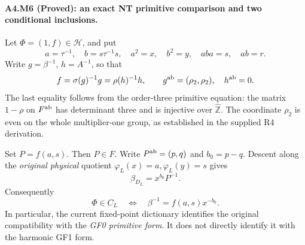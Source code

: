 \paragraph{A4.M6 (Proved): an exact NT primitive comparison and two conditional inclusions.}
Let $\Phi=(1,f)\in\mathcal H$, and put
\[
 a=\tau^{-1},\quad b=s\tau^{-1}s,\quad a^2=x,\quad b^2=y,
 \quad aba=s,\quad ab=r.
\]
Write $g=\beta^{-1}$, $h=A^{-1}$, so that
\[
 f=\sigma(g)^{-1}g=\rho(h)^{-1}h,
 \qquad g^{\rm ab}=(\rho_2,\rho_2),\quad h^{\rm ab}=0.
\]
The last equality follows from the order-three primitive equation:
the matrix $1-\rho$ on $F^{\rm ab}$ has determinant three and is
injective over $\widehat{\mathbb Z}$. The coordinate $\rho_2$ is even
on the whole multiplier-one group, as established in the supplied
R4 derivation.

Set $P=f(a,s)$. Then $P\in F$. Write $P^{\rm ab}=(p,q)$ and
$b_0=p-q$. Descent along the \emph{original physical} quotient
$\varphi_L(x)=a,\varphi_L(y)=s$ gives
\[
 \beta_{D_L}=x^{b_0}P^{-1}.                                     \tag{M6}
\]
Consequently
\[
 \Phi\in C_L\quad\Longleftrightarrow\quad
       \beta^{-1}=f(a,s)x^{-b_0}.                              \tag{M7}
\]
In particular, the current fixed-point dictionary identifies the
original compatibility with the \emph{GF0 primitive form}. It does
not directly identify it with the harmonic GF1 form.

